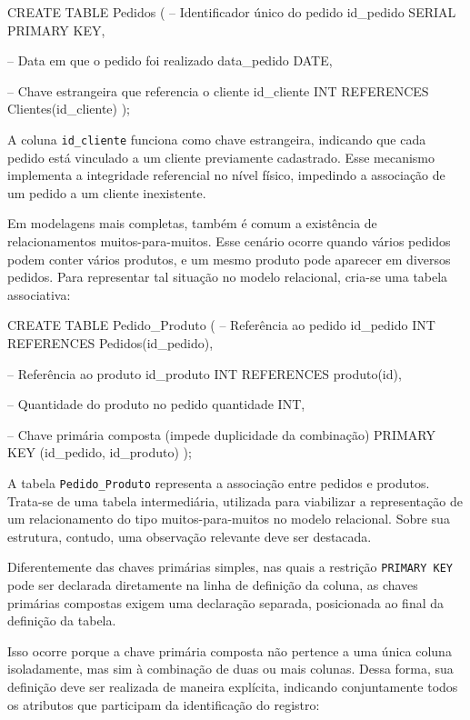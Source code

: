 \begin{sqlcode}
CREATE TABLE Pedidos (
    -- Identificador único do pedido
    id_pedido SERIAL PRIMARY KEY,

    -- Data em que o pedido foi realizado
    data_pedido DATE,

    -- Chave estrangeira que referencia o cliente
    id_cliente INT REFERENCES Clientes(id_cliente)
);
\end{sqlcode}

A coluna \texttt{id\_cliente} funciona como chave estrangeira, indicando que cada pedido está vinculado a um cliente previamente cadastrado. Esse mecanismo implementa a integridade referencial no nível físico, impedindo a associação de um pedido a um cliente inexistente.

Em modelagens mais completas, também é comum a existência de relacionamentos muitos-para-muitos. Esse cenário ocorre quando vários pedidos podem conter vários produtos, e um mesmo produto pode aparecer em diversos pedidos. Para representar tal situação no modelo relacional, cria-se uma tabela associativa:

\begin{sqlcode}
CREATE TABLE Pedido_Produto (
    -- Referência ao pedido
    id_pedido INT REFERENCES Pedidos(id_pedido),

    -- Referência ao produto
    id_produto INT REFERENCES produto(id),

    -- Quantidade do produto no pedido
    quantidade INT,

    -- Chave primária composta (impede duplicidade da combinação)
    PRIMARY KEY (id_pedido, id_produto)
);
\end{sqlcode}

A tabela \texttt{Pedido\_Produto} representa a associação entre pedidos e produtos. Trata-se de uma tabela intermediária, utilizada para viabilizar a representação de um relacionamento do tipo muitos-para-muitos no modelo relacional. Sobre sua estrutura, contudo, uma observação relevante deve ser destacada.

Diferentemente das chaves primárias simples, nas quais a restrição \texttt{PRIMARY KEY} pode ser declarada diretamente na linha de definição da coluna, as chaves primárias compostas exigem uma declaração separada, posicionada ao final da definição da tabela.

Isso ocorre porque a chave primária composta não pertence a uma única coluna isoladamente, mas sim à combinação de duas ou mais colunas. Dessa forma, sua definição deve ser realizada de maneira explícita, indicando conjuntamente todos os atributos que participam da identificação do registro:

